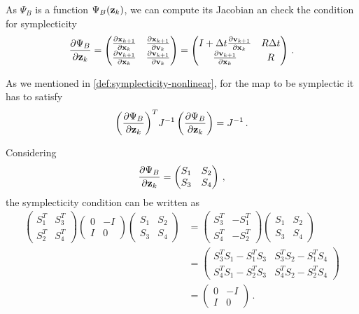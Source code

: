 \documentclass[12pt, class=report, crop=false]{standalone}
\begin{document}
As \(\Psi_B\) is a function \(\Psi_B(\vb{z}_k)\), we can compute
its Jacobian an check the condition for symplecticity
\[
\pdv{\Psi_B}{\vb{z}_k} =
\begin{pmatrix}
  \pdv{\vb{x}_{k+1}}{\vb{x}_k} & \pdv{\vb{x}_{k+1}}{\vb{v}_k} \\
  \pdv{\vb{v}_{k+1}}{\vb{x}_k} & \pdv{\vb{v}_{k+1}}{\vb{v}_k}
\end{pmatrix}
=
\begin{pmatrix}
  I + \Delta t \pdv{\vb{v}_{k+1}}{\vb{x}_k} & R \Delta t \\
  \pdv{\vb{v}_{k+1}}{\vb{x}_k} & R
\end{pmatrix}\,.
\]

As we mentioned in \cref{def:symplecticity-nonlinear}, for the map to be symplectic
it has to satisfy
\[
{\left(\pdv{\Psi_B}{\vb{z}_k}\right)}^T J^{-1} \left(\pdv{\Psi_B}{\vb{z}_k}\right) = J^{-1}\,.
\]

Considering
\[
\pdv{\Psi_B}{\vb{z}_k} =
\begin{pmatrix}
  S_1 & S_2 \\
  S_3 & S_4
\end{pmatrix}\,,
\]
the symplecticity condition can be written as
\begin{align*}
  \begin{pmatrix}
    S_1^T & S_3^T \\
    S_2^T & S_4^T
  \end{pmatrix}
  \begin{pmatrix}
    0 & -I \\
    I &  0
  \end{pmatrix}
  \begin{pmatrix}
    S_1 & S_2 \\
    S_3 & S_4
  \end{pmatrix}
  &=
  \begin{pmatrix}
    S_3^T & -S_1^T \\
    S_4^T & -S_2^T
  \end{pmatrix}
  \begin{pmatrix}
    S_1 & S_2 \\
    S_3 & S_4
  \end{pmatrix} \\
  &=
  \begin{pmatrix}
    S_3^T S_1 - S_1^T S_3 & S_3^T S_2 - S_1^T S_4 \\
    S_4^T S_1 - S_2^T S_3 & S_4^T S_2 - S_2^T S_4
  \end{pmatrix} \\
  &=
  \begin{pmatrix}
    0 & -I \\
    I &  0
  \end{pmatrix}\,.
\end{align*}
\end{document}
